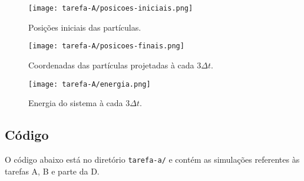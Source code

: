 
\begin{figure}[h!]
    \centering
    \texttt{[image: tarefa-A/posicoes-iniciais.png]}
    \caption{Posições iniciais das partículas.}
    \label{fig:posicoes-iniciais-a}
\end{figure}

\begin{figure}[h!]
    \centering 
    \texttt{[image: tarefa-A/posicoes-finais.png]}
    \label{fig:posicoes-finais-a}
    \caption{Coordenadas das partículas projetadas à cada $3 \Delta t$.}
\end{figure}

\begin{figure}[h!]
    \centering 
    \texttt{[image: tarefa-A/energia.png]}
    \caption{Energia do sistema à cada $3 \Delta t$.}
    \label{fig:energia_a}
\end{figure}

\clearpage
\subsection*{Código}
O código abaixo está no diretório \verb|tarefa-a/| e contém 
as simulações referentes às tarefas A, B e parte da D.

\clearpage